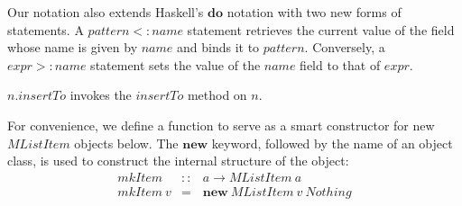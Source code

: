 \documentclass[runningheads,a4paper]{llncs}
\begin{document}
Our notation also extends Haskell's $\mathbf{do}$ notation with two new forms of statements. A $\mathit{pattern} <: \mathit{name}$ statement retrieves the current value of the field whose name is given by $\mathit{name}$ and binds it to $\mathit{pattern}$. Conversely, a $\mathit{expr} >: \mathit{name}$ statement sets the value of the $\mathit{name}$ field to that of $\mathit{expr}$.

$n.\mathit{insertTo}$ invokes the $\mathit{insertTo}$ method on $n$.

For convenience, we define a function to serve as a smart constructor for new $\mathit{MListItem}$ objects below. The $\mathbf{new}$ keyword, followed by the name of an object class, is used to construct the internal structure of the object:
\begin{displaymath}
\begin{array}{lcl}
\mathit{mkItem} & :: & a \to \mathit{MListItem}~a \\
\mathit{mkItem}~v & = & \mathbf{new}~\mathit{MListItem}~v~\mathit{Nothing}
\end{array}
\end{displaymath}
\end{document}
